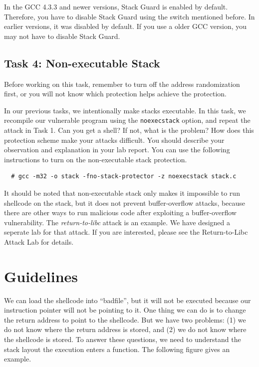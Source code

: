 In the GCC 4.3.3 and newer versions, Stack Guard is enabled by
default. Therefore, you have to disable Stack Guard using the switch
mentioned before. In earlier versions, it was disabled by default. If
you use a older GCC version, you may not have to disable Stack Guard. 

\subsection{Task 4: Non-executable Stack}

Before working on this task, remember to turn off the address
randomization first, or you will not know which protection helps 
achieve the protection.

In our previous tasks, we intentionally make stacks executable.
In this task, we recompile our vulnerable program 
using the {\tt noexecstack} option, and repeat the attack in
Task 1. Can you get a shell? If not, what is the problem? How does
this protection scheme make your attacks difficult. 
You should describe your observation and explanation
in your lab report. You can use the following instructions to turn
on the non-executable stack protection.

\begin{verbatim}
  # gcc -m32 -o stack -fno-stack-protector -z noexecstack stack.c
\end{verbatim}


It should be noted that non-executable stack only makes it impossible to run shellcode 
on the stack, but it does not prevent buffer-overflow attacks, 
because there are other ways to run malicious code after exploiting 
a buffer-overflow vulnerability. The {\em return-to-libc} attack
is an example. We have designed a seperate lab for that 
attack. If you are interested, please see the 
Return-to-Libc Attack Lab for details.



\section{Guidelines}

We can load the shellcode into ``badfile'', but it will not be executed because our
instruction pointer will not be pointing to it. One thing we can do is to change
the return address to point to the shellcode. But we have two problems:
(1) we do not know where the return address is stored, and
(2) we do not know where the shellcode is stored.
To answer these questions, we need to understand the stack layout the 
execution enters a function. The following figure gives 
an example.


